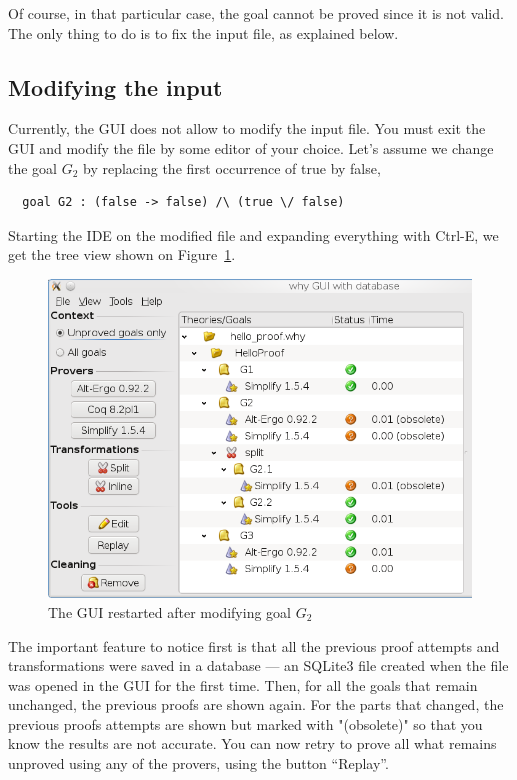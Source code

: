 Of course, in that particular case, the goal cannot be proved since it
is not valid. The only thing to do is to fix the input file, as
explained below.

\subsection{Modifying the input}

Currently, the GUI does not allow to modify the input file. You must
exit the GUI and modify the file by some editor of your choice. Let's assume we change the goal $G_2$ by replacing the first occurrence of true by false, \eg
\begin{verbatim}
  goal G2 : (false -> false) /\ (true \/ false)
\end{verbatim}
Starting the IDE on the modified file and expanding everything with
\textsf{Ctrl-E}, we get the tree view shown on Figure~\ref{fig:gui5}.

\begin{figure}[tbp]
  \includegraphics[width=\textwidth]{gui5.png}
  \caption{The GUI restarted after modifying goal $G_2$}
  \label{fig:gui5}
\end{figure}

The important feature to notice first is that all the previous proof
attempts and transformations were saved in a database --- an SQLite3
file created when the \why file was opened in the GUI for the first
time. Then, for
all the goals that remain unchanged, the previous proofs are shown
again. For the parts that changed, the previous proofs attempts are
shown but marked with "(obsolete)" so that you know the results are
not accurate. You can now retry to prove all what remains unproved
using any of the provers, using the button ``Replay''.

